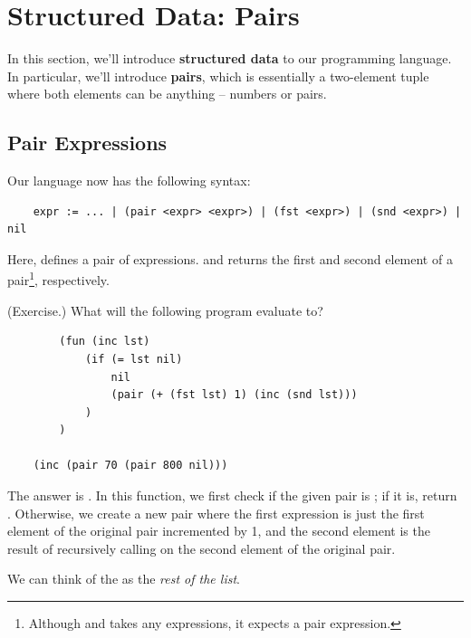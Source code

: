 \section{Structured Data: Pairs}
In this section, we'll introduce \textbf{structured data} to our programming language. In particular, we'll introduce \textbf{pairs}, which is essentially a two-element tuple where both elements can be anything -- numbers or pairs.

\subsection{Pair Expressions}
Our language now has the following syntax: 
\begin{verbatim}
    expr := ... | (pair <expr> <expr>) | (fst <expr>) | (snd <expr>) | nil\end{verbatim}
Here,  defines a pair of expressions.  and  returns the first and second element of a pair\footnote{Although  and  takes any expressions, it expects a pair expression.}, respectively.

\begin{mdframed}
    (Exercise.) What will the following program evaluate to? 
    \begin{verbatim}
        (fun (inc lst)
            (if (= lst nil)
                nil
                (pair (+ (fst lst) 1) (inc (snd lst)))
            )
        )
    
    (inc (pair 70 (pair 800 nil)))\end{verbatim}

    \begin{mdframed}
        The answer is . In this function, we first check if the given pair is ; if it is, return . Otherwise, we create a new pair where the first expression is just the first element of the original pair incremented by 1, and the second element is the result of recursively calling  on the second element of the original pair.

        \bigskip 

        We can think of the  as the \emph{rest of the list}. 
    \end{mdframed}
\end{mdframed}

